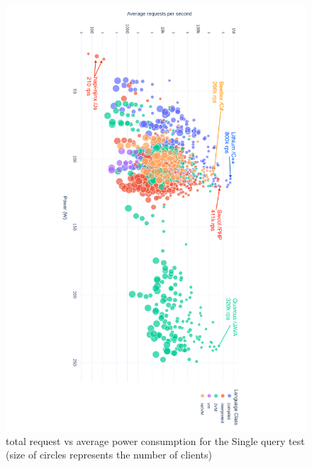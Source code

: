 \begin{figure}[hbt]
    \caption{total request vs average power consumption for the Single query test (size of circles represents the number of clients) }
    \label{fig:power_requests_query}
    \includegraphics[width=
        \columnwidth,angle=9
        0]{imgs/power_requests_query_log}

\end{figure}


